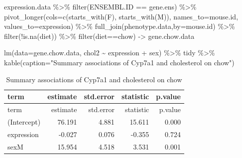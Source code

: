 \documentclass[
]{article}
\newenvironment{Shaded}{\begin{snugshade}}{\end{snugshade}}
\newcommand{\AttributeTok}[1]{\textcolor[rgb]{0.77,0.63,0.00}{#1}}
\newcommand{\FunctionTok}[1]{\textcolor[rgb]{0.00,0.00,0.00}{#1}}
\newcommand{\NormalTok}[1]{#1}
\newcommand{\OtherTok}[1]{\textcolor[rgb]{0.56,0.35,0.01}{#1}}
\newcommand{\SpecialCharTok}[1]{\textcolor[rgb]{0.00,0.00,0.00}{#1}}
\newcommand{\StringTok}[1]{\textcolor[rgb]{0.31,0.60,0.02}{#1}}
\begin{document}
\begin{Shaded}
\begin{Highlighting}[]
\NormalTok{expression.data }\SpecialCharTok{\%\textgreater{}\%}
  \FunctionTok{filter}\NormalTok{(ENSEMBL.ID }\SpecialCharTok{==}\NormalTok{ gene.ens) }\SpecialCharTok{\%\textgreater{}\%}
  \FunctionTok{pivot\_longer}\NormalTok{(}\AttributeTok{cols=}\FunctionTok{c}\NormalTok{(}\FunctionTok{starts\_with}\NormalTok{(}\StringTok{\textquotesingle{}F\textquotesingle{}}\NormalTok{),}
                      \FunctionTok{starts\_with}\NormalTok{(}\StringTok{\textquotesingle{}M\textquotesingle{}}\NormalTok{)),}
               \AttributeTok{names\_to=}\StringTok{\textquotesingle{}mouse.id\textquotesingle{}}\NormalTok{,}
               \AttributeTok{values\_to=}\StringTok{\textquotesingle{}expression\textquotesingle{}}\NormalTok{) }\SpecialCharTok{\%\textgreater{}\%}
  \FunctionTok{full\_join}\NormalTok{(phenotype.data,}\AttributeTok{by=}\StringTok{\textquotesingle{}mouse.id\textquotesingle{}}\NormalTok{) }\SpecialCharTok{\%\textgreater{}\%}
  \FunctionTok{filter}\NormalTok{(}\SpecialCharTok{!}\FunctionTok{is.na}\NormalTok{(diet)) }\SpecialCharTok{\%\textgreater{}\%}
  \FunctionTok{filter}\NormalTok{(diet}\SpecialCharTok{==}\StringTok{\textquotesingle{}chow\textquotesingle{}}\NormalTok{) }\OtherTok{{-}\textgreater{}}\NormalTok{ gene.chow.data}

\FunctionTok{lm}\NormalTok{(}\AttributeTok{data=}\NormalTok{gene.chow.data, chol2 }\SpecialCharTok{\textasciitilde{}}\NormalTok{ expression }\SpecialCharTok{+}\NormalTok{ sex) }\SpecialCharTok{\%\textgreater{}\%}
\NormalTok{  tidy }\SpecialCharTok{\%\textgreater{}\%}
  \FunctionTok{kable}\NormalTok{(}\AttributeTok{caption=}\StringTok{"Summary associations of Cyp7a1 and cholesterol on chow"}\NormalTok{)}
\end{Highlighting}
\end{Shaded}

\begin{longtable}[]{@{}lrrrr@{}}
\caption{Summary associations of Cyp7a1 and cholesterol on
chow}\tabularnewline
\toprule()
term & estimate & std.error & statistic & p.value \\
\midrule()
\endfirsthead
\toprule()
term & estimate & std.error & statistic & p.value \\
\midrule()
\endhead
(Intercept) & 76.191 & 4.881 & 15.611 & 0.000 \\
expression & -0.027 & 0.076 & -0.355 & 0.724 \\
sexM & 15.954 & 4.518 & 3.531 & 0.001 \\
\bottomrule()
\end{longtable}
\end{document}
